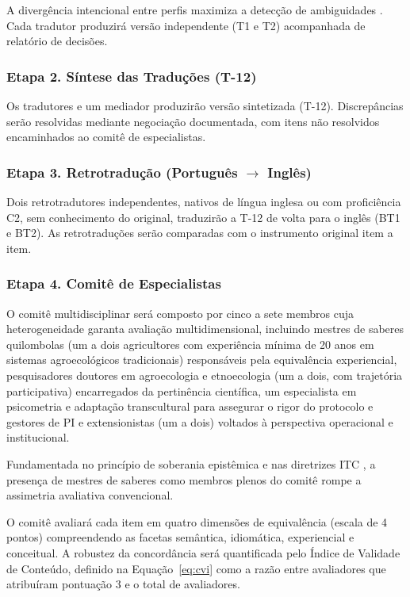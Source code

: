 \documentclass[3p,times]{elsarticle}
\begin{document}
A divergência intencional entre perfis maximiza a detecção de ambiguidades \citep{Beaton2000}. Cada tradutor produzirá versão independente (T1 e T2) acompanhada de relatório de decisões.

\subsubsection{Etapa 2. Síntese das Traduções (T-12)}

Os tradutores e um mediador produzirão versão sintetizada (T-12). Discrepâncias serão resolvidas mediante negociação documentada, com itens não resolvidos encaminhados ao comitê de especialistas.

\subsubsection{Etapa 3. Retrotradução (Português $\rightarrow$ Inglês)}

Dois retrotradutores independentes, nativos de língua inglesa ou com proficiência C2, sem conhecimento do original, traduzirão a T-12 de volta para o inglês (BT1 e BT2). As retrotraduções serão comparadas com o instrumento original item a item.

\subsubsection{Etapa 4. Comitê de Especialistas}

O comitê multidisciplinar será composto por cinco a sete membros cuja heterogeneidade garanta avaliação multidimensional, incluindo mestres de saberes quilombolas (um a dois agricultores com experiência mínima de 20 anos em sistemas agroecológicos tradicionais) responsáveis pela equivalência experiencial, pesquisadores doutores em agroecologia e etnoecologia (um a dois, com trajetória participativa) encarregados da pertinência científica, um especialista em psicometria e adaptação transcultural para assegurar o rigor do protocolo e gestores de PI e extensionistas (um a dois) voltados à perspectiva operacional e institucional.

Fundamentada no princípio de soberania epistêmica \citep{Santos2007} e nas diretrizes ITC \citep{ITC2017}, a presença de mestres de saberes como membros plenos do comitê rompe a assimetria avaliativa convencional.

O comitê avaliará cada item em quatro dimensões de equivalência (escala de 4 pontos) compreendendo as facetas semântica, idiomática, experiencial e conceitual. A robustez da concordância será quantificada pelo Índice de Validade de Conteúdo, definido na Equação~\ref{eq:cvi} como a razão entre avaliadores que atribuíram pontuação 3 e o total de avaliadores.
\end{document}
